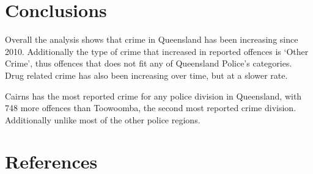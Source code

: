 \documentclass[]{article}
\begin{document}
\section{Conclusions}

Overall the analysis shows that crime in Queensland has been increasing since 2010.
Additionally the type of crime that increased in reported offences is `Other Crime', thus offences that does not fit any of Queensland Police's categories.
Drug related crime has also been increasing over time, but at a slower rate.

Cairns has the most reported crime for any police division in Queensland, with 748 more offences than Toowoomba, the second most reported crime division.
Additionally unlike most of the other police regions.

\section{References}



\end{document}
